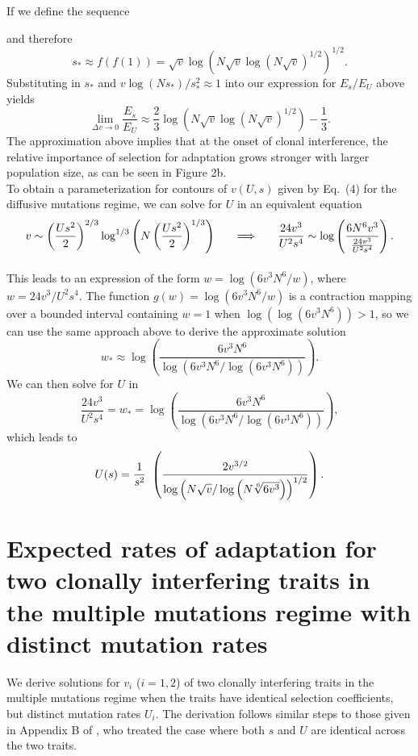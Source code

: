 \documentclass[11pt,onecolumn]{article}
\begin{document}
If we define the sequence {and therefore 
\[
s_*\approx f(f(1))= \sqrt{v}\log(N\sqrt{v}\log(N\sqrt{v})^{1/2})^{1/2}.
\]
Substituting in $s_*$ and $v\log(Ns_*)/s_*^2 \approx 1$ into our expression for $E_s/E_U$ above yields
\begin{equation}\label{eq:supp:EsEuMM}
\lim_{\Delta v\rightarrow 0}\frac{E_s}{E_U} \approx \frac{2}{3}\log(N\sqrt{v}\log(N\sqrt{v})^{1/2})-\frac{1}{3}.
\end{equation}
The approximation above implies that at the onset of clonal interference, the relative importance of selection for adaptation grows stronger with larger population size, as can be seen in Figure 2b.\\

To obtain a parameterization for contours of $v(U,s)$ given by Eq.~(4) for the diffusive mutations regime, we can solve for $U$ in an equivalent equation
\[
\begin{aligned}
v\sim \left(\frac{Us^2}{2}\right)^{2/3} \log^{1/3}\left( N \left(\frac{Us^2}{2}\right)^{1/3} \right) \hspace{.2in}& \implies \hspace{.2in} \frac{24v^3}{U^2s^4} \sim  \log \left( \frac{6N^6 v^3 }{\frac{24v^3}{U^2s^4}} \right).\\[3mm]
\end{aligned}
\]
This leads to an expression of the form $w= \log\left(6v^3N^6/{w}\right)$,
where $w = 24v^3/U^2s^4$. The function $g(w)=\log\left(6v^3N^6/{w}\right)$ is a contraction mapping over a bounded interval containing $w=1$ when $\log(\log(6v^3N^6))>1$, so we can use the same approach above to derive the approximate solution
\[
w_* \approx \log \left( \frac{6v^3N^6}{\log (6v^3N^6/\log (6v^3N^6))} \right).
\]
We can then solve for $U$ in
\[
\frac{24v^3}{U^2s^4} = w_* = \log \left( \frac{6v^3N^6}{\log (6v^3N^6/\log (6v^3N^6))} \right),
\]
which leads to 
\begin{equation} \label{eq:app:UparamHallatschek}
    U(s) = \frac{1}{s^2}\hspace{.05in}\left ( \frac{2v^{3/2}}{\log \left(N \sqrt{v}/\log \left(N\sqrt[6]{6v^3}\right)\right)^{1/2}} \right).
\end{equation}
 

\section{Expected rates of adaptation for two clonally interfering traits in the multiple mutations regime with distinct mutation rates} \label{sec:app:elastVcontours}
We derive solutions for $v_i$ ($i=1,2$) of two clonally interfering traits in the multiple mutations regime when the traits have identical selection coefficients, but distinct mutation rates $U_i$. The derivation follows similar steps to those given in Appendix B of \citet{gomez2019directional}, who treated the case where both $s$ and $U$ are identical across the two traits.

}
\end{document}
